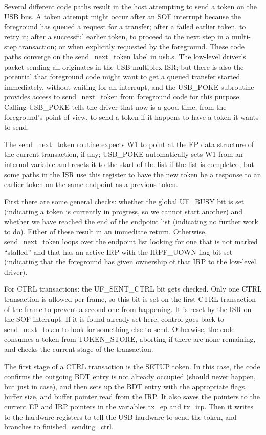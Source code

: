Several different code paths result in the host attempting to send a token
on the USB bus.  A token attempt might occur after an SOF interrupt because
the foreground has queued a request for a transfer; after a failed earlier
token, to retry it; after a successful earlier token, to proceed to the next
step in a multi-step transaction; or when explicitly requested by the
foreground.  These code paths converge on the send\_next\_token label in
usb.s.  The low-level driver's packet-sending all originates in the USB
multiplex ISR; but there is also the potential that foreground code might
want to get a queued transfer started immediately, without waiting for an
interrupt, and the USB\_POKE subroutine provides access to send\_next\_token
from foreground code for this purpose.  Calling USB\_POKE tells the driver
that now is a good time, from the foreground's point of view, to send a
token if it happens to have a token it wants to send.

The send\_next\_token routine expects W1 to point at the EP data structure
of the current transaction, if any; USB\_POKE automatically sets W1 from an
internal variable and resets it to the start of the list if the list is
completed, but some paths in the ISR use this register to have the new token
be a response to an earlier token on the same endpoint as a previous token.

First there are some general checks:  whether the global UF\_BUSY bit is set
(indicating a token is currently in progress, so we cannot start another)
and whether we have reached the end of the endpoint list (indicating no
further work to do).  Either of these result in an immediate return. 
Otherwise, send\_next\_token loops over the endpoint list looking for one
that is not marked ``stalled'' and that has an active IRP with the
IRPF\_UOWN flag bit set (indicating that the foreground has given ownership
of that IRP to the low-level driver).

For CTRL transactions:  the UF\_SENT\_CTRL bit gets checked.  Only one CTRL
transaction is allowed per frame, so this bit is set on the first CTRL
transaction of the frame to prevent a second one from happening.  It is
reset by the ISR on the SOF interrupt.  If it is found already set here,
control goes back to send\_next\_token to look for something else to send.
Otherwise, the code consumes a token from TOKEN\_STORE, aborting if there
are none remaining, and checks the current stage of the transaction.

The first stage of a CTRL transaction is the SETUP token.  In this case, the
code confirms the outgoing BDT entry is not already occupied (should never
happen, but just in case), and then sets up the BDT entry with the
appropriate flags, buffer size, and buffer pointer read from the IRP.  It
also saves the pointers to the current EP and IRP pointers in the variables
tx\_ep and tx\_irp.  Then it writes to the hardware registers to tell the
USB hardware to send the token, and branches to finished\_sending\_ctrl.

